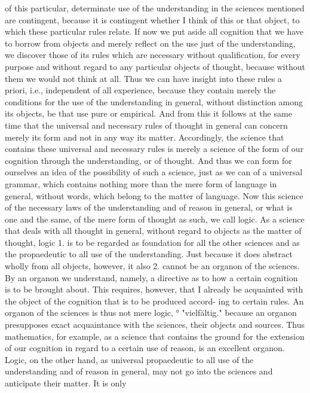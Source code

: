 of this particular, determinate use of the understanding in the sciences
mentioned are contingent, because it is contingent whether I think of this
or that object, to which these particular rules relate.
If now we put aside all cognition that we have to borrow from objects and
merely reflect on the use just of the understanding, we discover those of
its rules which are necessary without qualification, for every purpose and
without regard to any particular objects of thought, because without them
we would not think at all. Thus we can have insight into these rules a
priori, i.e., independent of all experience, because they contain merely the
conditions for the use of the understanding in general, without distinction
among its objects, be that use pure or empirical. And from this it follows at
the same time that the universal and necessary rules of thought in general
can concern merely its form and not in any way its matter. Accordingly, the
science that contains these universal and necessary rules is merely a
science of the form of our cognition through the understanding, or of
thought. And thus we can form for ourselves an idea of the possibility of
such a science, just as we can of a universal grammar, which contains
nothing more than the mere form of language in general, without words,
which belong to the matter of language.
Now this science of the necessary laws of the understanding and of
reason in general, or what is one and the same, of the mere form of
thought as such, we call logic.
As a science that deals with all thought in general, without regard to
objects as the matter of thought, logic
1. is to be regarded as foundation for all the other sciences and as the
propaedeutic to all use of the understanding. Just because it does abstract
wholly from all objects, however, it also
2. cannot be an organon of the sciences.
By an organon we understand, namely, a directive as to how a certain
cognition is to be brought about. This requires, however, that I already be
acquainted with the object of the cognition that is to be produced accord-
ing to certain rules. An organon of the sciences is thus not mere logic,
°
"vielfältig."
because an organon presupposes exact acquaintance with the sciences,
their objects and sources. Thus mathematics, for example, as a science
that contains the ground for the extension of our cognition in regard to a
certain use of reason, is an excellent organon. Logic, on the other hand, as
universal propaedeutic to all use of the understanding and of reason in
general, may not go into the sciences and anticipate their matter. It is only
